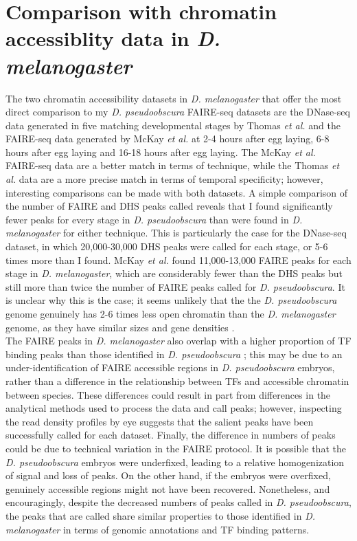 \section{Comparison with chromatin accessiblity data in \emph{D. melanogaster}}
The two chromatin accessibility datasets in \emph{D. melanogaster} that offer the most direct comparison to my \emph{D. pseudoobscura} FAIRE-seq datasets are the DNase-seq data generated in five matching developmental stages by Thomas \emph{et al.} \citet{thomas_dynamic_2011} and the FAIRE-seq data generated by McKay \emph{et al.} \citet{mckay_common_2013} at 2-4 hours after egg laying, 6-8 hours after egg laying and 16-18 hours after egg laying. The McKay \emph{et al.} FAIRE-seq data are a better match in terms of technique, while the Thomas \emph{et al.} data are a more precise match in terms of temporal specificity; however, interesting comparisons can be made with both datasets. A simple comparison of the number of FAIRE and DHS peaks called reveals that I found significantly fewer peaks for every stage in \emph{D. pseudoobscura} than were found in \emph{D. melanogaster} for either technique. This is particularly the case for the DNase-seq dataset, in which 20,000-30,000 DHS peaks were called for each stage, or 5-6 times more than I found. McKay \emph{et al.} found 11,000-13,000 FAIRE peaks for each stage in \emph{D. melanogaster}, which are considerably fewer than the DHS peaks but still more than twice the number of FAIRE peaks called for \emph{D. pseudoobscura}. It is unclear why this is the case; it seems unlikely that the the \emph{D. pseudoobscura} genome genuinely has 2-6 times less open chromatin than the \emph{D. melanogaster} genome, as they have similar sizes and gene densities \citep{richards_comparative_2005}.\\ 

The FAIRE peaks in \emph{D. melanogaster} also overlap with a higher proportion of TF binding peaks than those identified in \emph{D. pseudoobscura} \citep{mckay_common_2013}; this may be due to an under-identification of FAIRE accessible regions in \emph{D. pseudoobscura} embryos, rather than a difference in the relationship between TFs and accessible chromatin between species. These differences could result in part from differences in the analytical methods used to process the data and call peaks; however, inspecting the read density profiles by eye suggests that the salient peaks have been successfully called for each dataset. Finally, the difference in numbers of peaks could be due to technical variation in the FAIRE protocol. It is possible that the \emph{D. pseudoobscura} embryos were underfixed, leading to a relative homogenization of signal and loss of peaks. On the other hand, if the embryos were overfixed, genuinely accessible regions might not have been recovered. Nonetheless, and encouragingly, despite the decreased numbers of peaks called in \emph{D. pseudoobscura}, the peaks that are called share similar properties to those identified in \emph{D. melanogaster} in terms of genomic annotations and TF binding patterns.\\

